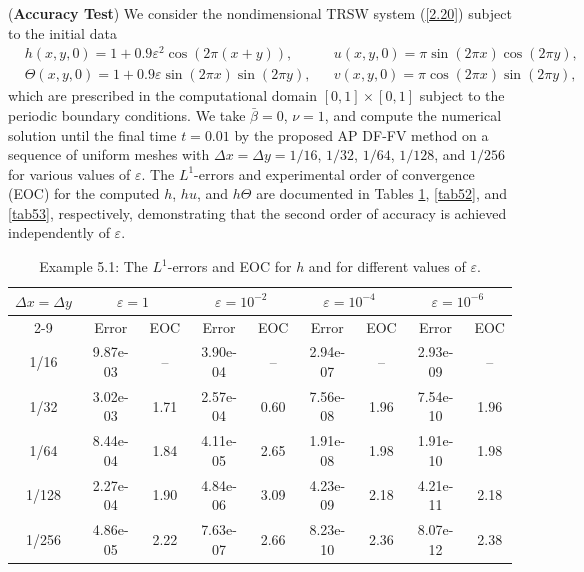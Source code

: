 \documentclass[a4paper,11pt,twoside]{article}
\numberwithin{equation}{section}
\numberwithin{figure}{section}
\numberwithin{table}{section}
\newcommand{\eps}{\varepsilon}
\newcommand{\dx}{\Delta x}
\newcommand{\dy}{\Delta y}
\newcommand\eref[1]{(\ref{#1})}
\begin{document}
\begin{example}({\bf Accuracy Test})
We consider the nondimensional TRSW system \eref{2.20} subject to the initial data
\begin{equation*}
\begin{aligned}
&h(x,y,0)=1+0.9\eps^2\cos(2\pi(x+y)),&&u(x,y,0)=\pi\sin(2\pi x)\cos(2\pi y),\\
&\Theta(x,y,0)=1+0.9\eps\sin(2\pi x)\sin(2\pi y),&&v(x,y,0)=\pi\cos(2\pi x)\sin(2\pi y),
\end{aligned}
\end{equation*}
which are prescribed in the computational domain $[0,1]\times[0,1]$ subject to the periodic boundary conditions. We take $\bar\beta=0$,
$\nu=1$, and compute the numerical solution until the final time $t=0.01$ by the proposed AP DF-FV method on a sequence of uniform meshes
with $\dx=\dy=1/16$, $1/32$, $1/64$, $1/128$, and $1/256$ for various values of $\eps$. The $L^1$-errors and experimental order of
convergence (EOC) for the computed $h$, $hu$, and $h\Theta$ are documented in Tables \ref{tab51}, \ref{tab52}, and \ref{tab53},
respectively, demonstrating that the second order of accuracy is achieved independently of $\eps$.
\begin{table}[ht!]
\centering
\begin{tabular}{|c|cc|cc|cc|cc|}
\hline
\multirow{2}{*}{$\dx=\dy$}&\multicolumn{2}{c|}{$\eps=1$}&\multicolumn{2}{c|}{$\eps=10^{-2}$}&\multicolumn{2}{c|}{$\eps=10^{-4}$}
&\multicolumn{2}{c|}{$\eps=10^{-6}$}\\
\cline{2-9}
&Error&EOC&Error&EOC&Error&EOC&Error&EOC\\
\hline  		         
1/16 &9.87e-03& -- &3.90e-04& -- &2.94e-07& -- &2.93e-09& -- \\
1/32 &3.02e-03&1.71&2.57e-04&0.60&7.56e-08&1.96&7.54e-10&1.96\\        
1/64 &8.44e-04&1.84&4.11e-05&2.65&1.91e-08&1.98&1.91e-10&1.98\\          
1/128&2.27e-04&1.90&4.84e-06&3.09&4.23e-09&2.18&4.21e-11&2.18\\
1/256&4.86e-05&2.22&7.63e-07&2.66&8.23e-10&2.36&8.07e-12&2.38\\
\hline
\end{tabular}
\caption{\sf Example 5.1: The $L^1$-errors and EOC for $h$ and for different values of $\eps$.\label{tab51}}
\end{table}
\begin{table}[ht!]
\centering
\begin{tabular}{|c|cc|cc|cc|cc|}

\end{tabular}
\end{table}
\end{example}
\end{document}
